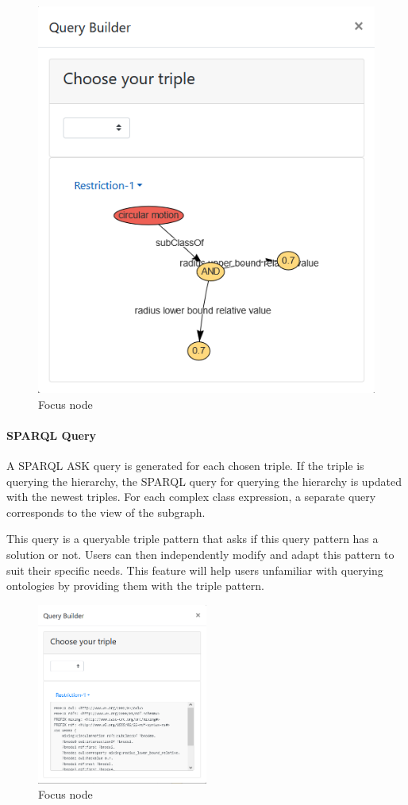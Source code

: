 \begin{figure}[H]
    \includegraphics[scale=0.4]{Graphics/OwlVisualizer/queryBuilder4.png}
    \centering
    \caption{Focus node}
\end{figure}

\paragraph{SPARQL Query}
A SPARQL ASK query is generated for each chosen triple. If the triple is querying the hierarchy, the SPARQL query for querying the hierarchy is updated with the newest triples.
For each complex class expression, a separate query corresponds to the view of the subgraph.

This query is a queryable triple pattern that asks if this query pattern has a solution or not. 
Users can then independently modify and adapt this pattern to suit their specific needs. 
This feature will help users unfamiliar with querying ontologies by providing them with the triple pattern.
\begin{figure}[H]
    \includegraphics[width=0.5\textwidth]{Graphics/OwlVisualizer/queryBuilder5.png}
    \centering
    \caption{Focus node}
\end{figure}

